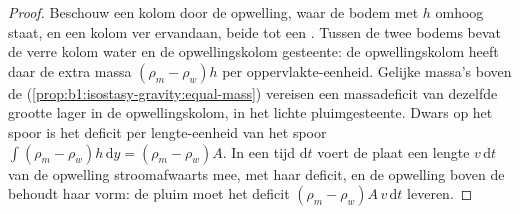 \begin{proof}
Beschouw een kolom door de opwelling, waar de bodem met $h$ omhoog staat, en een kolom ver ervandaan, beide tot een . Tussen de twee bodems bevat de verre kolom water en de opwellingskolom gesteente: de opwellingskolom heeft daar de extra massa $(\rho_m - \rho_w)h$ per oppervlakte-eenheid. Gelijke massa's boven de  (\cref{prop:b1:isostasy-gravity:equal-mass}) vereisen een massadeficit van dezelfde grootte lager in de opwellingskolom, in het lichte pluimgesteente. Dwars op het spoor is het deficit per lengte-eenheid van het spoor $\int(\rho_m - \rho_w)h\,\mathrm dy = (\rho_m - \rho_w)A$. In een tijd $\mathrm dt$ voert de plaat een lengte $v\,\mathrm dt$ van de opwelling stroomafwaarts mee, met haar deficit, en de opwelling boven de  behoudt haar vorm: de pluim moet het deficit $(\rho_m - \rho_w)A\,v\,\mathrm dt$ leveren.
\end{proof}

